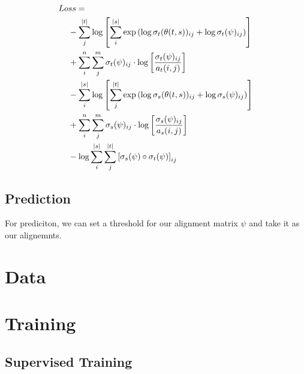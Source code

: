 \documentclass[twoside,twocolumn]{article}
\begin{document}
\begin{equation}
  \centering
\begin{split}
  Lo&ss = \\
  &- \sum_j^{|t|} \log \left[ \sum_i^{|s|} \exp \left( \log \sigma_t(\theta(t, s))_{ij} + \log \sigma_t(\psi)_{ij} \right) \right] \\
  &+ \sum_i^n \sum_j^m \sigma_t(\psi)_{ij}  \cdot \log \left[ \frac{\sigma_t(\psi)_{ij}}{a_t(i, j)} \right] \\
  &- \sum_i^{|s|} \log \left[ \sum_j^{|t|} \exp \left( \log \sigma_s(\theta(t, s))_{ij} + \log \sigma_s(\psi)_{ij} \right) \right] \\
  &+ \sum_i^n \sum_j^m \sigma_s(\psi)_{ij}  \cdot \log \left[ \frac{\sigma_s(\psi)_{ij}}{a_s(i, j)} \right] \\
  &- \log \sum_i^{|s|} \sum_j^{|t|} \left[ \sigma_s(\psi) \circ \sigma_t(\psi) \right]_{ij} \\
\end{split}
\end{equation}


\subsection{Prediction}

For prediciton, we can set a threshold for our alignment matrix $\psi$ and take it as our alignemnts.

\section{Data}

\section{Training}

\subsection{Supervised Training}
\end{document}
